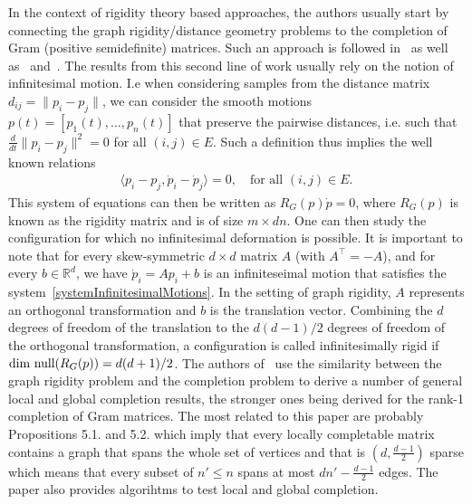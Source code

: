 \documentclass[12pt]{article}
\begin{document}
In the context of rigidity theory based approaches,  the authors usually start by connecting the graph rigidity/distance geometry problems to the completion of Gram (positive semidefinite) matrices.  Such an approach is followed in~\cite{singer2010uniqueness} as well as~\cite{hendrickson1992conditions} and~\cite{jackson2014combinatorial}.  The results from this second line of work usually rely on the notion of infinitesimal motion. I.e when considering samples from the distance matrix $d_{ij} = \|p_i - p_j\|$,  we can consider the smooth motions $p(t) = [p_1(t), \ldots, p_n(t)]$ that preserve the pairwise distances, i.e. such that $\frac{d}{dt}\|p_i - p_j\|^2 = 0$ for all $(i,j)\in E$.  Such a definition thus implies the well known relations 
\begin{align}
\langle p_i - p_j,  \dot{p}_i - \dot{p}_j \rangle  = 0, \quad \text{for all $(i,j)\in E$.}\label{systemInfinitesimalMotions}
\end{align}
This system of equations can then be written as $R_G(p)\dot{p} = 0$, where $R_G(p)$ is known as the rigidity matrix and is of size $m\times dn$.  One can then study the configuration for which no infinitesimal deformation is possible. It is important to note that for every skew-symmetric $d\times d$ matrix $A$ (with $A^\intercal  = -A$),  and for every $b\in \mathbb{R}^d$, we have $\dot{p}_i = Ap_i + b$ is an infiniteseimal motion that satisfies the system~\eqref{systemInfinitesimalMotions}. In the setting of graph rigidity, $A$ represents an orthogonal transformation and $b$ is the translation vector.  Combining the $d$ degrees of freedom of the translation to the $d(d-1)/2$ degrees of freedom of the orthogonal transformation, a configuration is called infinitesimally rigid if $\text{\upshape dim null}(R_G(p)) = d(d+1)/2$.  The authors of~\cite{singer2010uniqueness} use the similarity between the graph rigidity problem and the completion problem to derive a number of general local and global completion results, the stronger ones being derived for the rank-1 completion of Gram matrices.  The most related to this paper are probably Propositions 5.1. and 5.2. which imply that every locally completable matrix contains a graph that spans the whole set of vertices and that is $(d, \frac{d-1}{2})$ sparse which means that every subset of $n'\leq n$ spans at most $dn' - \frac{d-1}{2}$ edges.  The paper also provides algorihtms to test local and global completion.  
\end{document}

